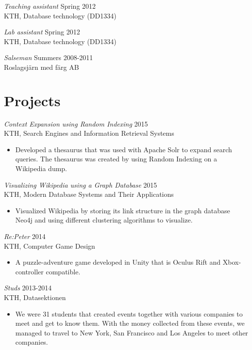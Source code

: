 \documentclass[margin, 10pt]{res} %
\begin{document}
\begin{resume}
{\sl Teaching assistant} \hfill Spring 2012 \\
KTH, Database technology (DD1334)

{\sl Lab assistant} \hfill Spring 2012 \\
KTH, Database technology (DD1334)

{\sl Salseman} \hfill Summers 2008-2011 \\
Roslagsjärn med färg AB


\section{Projects}

{\sl Context Expansion using Random Indexing} \hfill 2015 \\
KTH, Search Engines and Information Retrieval Systems
\begin{itemize} 
\item Developed a thesaurus that was used with Apache Solr to expand search queries. The thesaurus was created by using Random Indexing on a Wikipedia dump.
\end{itemize} 

{\sl Visualizing Wikipedia using a Graph Database} \hfill 2015 \\
KTH, Modern Database Systems and Their Applications
\begin{itemize} 
\item Visualized Wikipedia by storing its link structure in the graph database Neo4j and using different clustering algorithms to visualize.
\end{itemize} 

{\sl Re:Peter} \hfill 2014 \\
KTH, Computer Game Design
\begin{itemize} 
\item A puzzle-adventure game developed in Unity that is Oculus Rift and Xbox-controller compatible.
\end{itemize} 

{\sl Studs} \hfill 2013-2014 \\
KTH, Datasektionen
\begin{itemize} 
\item We were 31 students that created events together with various companies to meet and get to know them. With the money collected from these events, we managed to travel to New York, San Francisco and Los Angeles to meet other companies.
\end{itemize} 


\end{resume}
\end{document}
